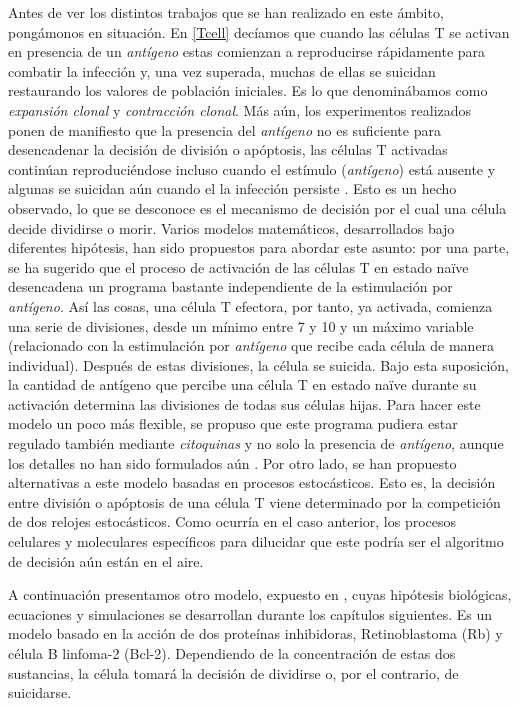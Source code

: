 Antes de ver los distintos trabajos que se han realizado en este ámbito, pongámonos en situación. En \ref{Tcell} decíamos que cuando las células T se activan en presencia de un \textit{antígeno} estas comienzan a reproducirse rápidamente para combatir la infección y, una vez superada, muchas de ellas se suicidan restaurando los valores de población iniciales. Es lo que denominábamos como \textit{expansión clonal} y \textit{contracción clonal}. Más aún, los experimentos realizados ponen de manifiesto que la presencia del \textit{antígeno} no es suficiente para desencadenar la decisión de división o apóptosis, las células T activadas continúan reproduciéndose incluso cuando el estímulo (\textit{antígeno}) está ausente y algunas se suicidan aún cuando el la infección persiste \citep{JTB}. Esto es un hecho observado, lo que se desconoce es el mecanismo de decisión por el cual una célula decide dividirse o morir. Varios modelos matemáticos, desarrollados bajo diferentes hipótesis, han sido propuestos para abordar este asunto: por una parte, se ha sugerido que el proceso de activación de las células T en estado naïve desencadena un programa bastante independiente de la estimulación por \textit{antígeno}. Así las cosas, una célula T efectora, por tanto, ya activada, comienza una serie de divisiones, desde un mínimo entre 7 y 10 y un máximo variable (relacionado con la estimulación por \textit{antígeno} que recibe cada célula de manera individual). Después de estas divisiones, la célula se suicida. Bajo esta suposición, la cantidad de antígeno que percibe una célula T en estado naïve durante su activación determina las divisiones de todas sus células hijas. Para hacer este modelo un poco más flexible, se propuso que este programa pudiera estar regulado también mediante \textit{citoquinas} y no solo la presencia de \textit{antígeno}, aunque los detalles no han sido formulados aún \citep{JTB}. Por otro lado, se han propuesto alternativas a este modelo basadas en procesos estocásticos. Esto es, la decisión entre división o apóptosis de una célula T viene determinado por la competición de dos relojes estocásticos. Como ocurría en el caso anterior, los procesos celulares y moleculares específicos para dilucidar que este podría ser el algoritmo de decisión aún están en el aire. 

A continuación presentamos otro modelo, expuesto en \cite{JTB}, cuyas hipótesis biológicas, ecuaciones y simulaciones se desarrollan durante los capítulos siguientes. Es un modelo basado en la acción de dos proteínas inhibidoras, Retinoblastoma (Rb) y célula B linfoma-2 (Bcl-2). Dependiendo de la concentración de estas dos sustancias, la célula tomará la decisión de dividirse o, por el contrario, de suicidarse.  


